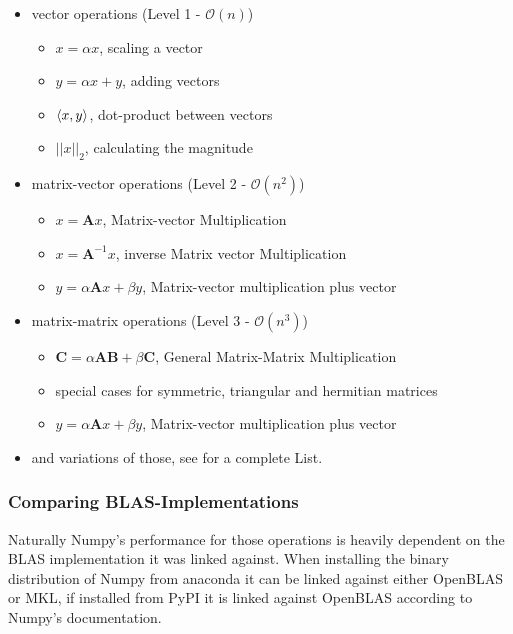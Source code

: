 \documentclass[english,11pt,a4paper,table]{article} %
\let\originalleft\left
\let\originalright\right
\renewcommand{\left}{\mathopen{}\mathclose\bgroup\originalleft}
\renewcommand{\right}{\aftergroup\egroup\originalright}
\begin{document}
\begin{itemize}
	\item vector operations (Level 1 - $\mathcal{O}(n)$)
	      \begin{itemize}
		      \item $x = \alpha x$, scaling a vector
		      \item $y = \alpha x + y$, adding vectors
		      \item $\left\langle x, y \right\rangle$, dot-product between vectors
		      \item $||x||_2$, calculating the magnitude
	      \end{itemize}
	\item matrix-vector operations (Level 2 - $\mathcal{O}(n^2)$)
	      \begin{itemize}
		      \item $x = \mathbf{A}x$, Matrix-vector Multiplication
		      \item $x = \mathbf{A}^{-1}x$, inverse Matrix vector Multiplication
		      \item $y = \alpha \mathbf{A} x + \beta y$, Matrix-vector multiplication plus vector
	      \end{itemize}
	\item matrix-matrix operations (Level 3 - $\mathcal{O}(n^3)$)
	      \begin{itemize}
		      \item $\mathbf{C} = \alpha\mathbf{A}\mathbf{B} + \beta\mathbf{C}$, General Matrix-Matrix Multiplication
		      \item special cases for symmetric, triangular and hermitian matrices
		      \item $y = \alpha \mathbf{A} x + \beta y$, Matrix-vector multiplication plus vector
	      \end{itemize}
	\item and variations of those, see \cite{BLAS} for a complete List.
\end{itemize}


\subsubsection{Comparing BLAS-Implementations}
\label{blas-numpy}

Naturally Numpy's performance for those operations is heavily dependent on the BLAS implementation it was linked against.
When installing the binary distribution of Numpy from anaconda \cite{anaconda} it can be linked against either OpenBLAS or MKL, if installed from PyPI it is linked against OpenBLAS according to Numpy's documentation.
\end{document}
